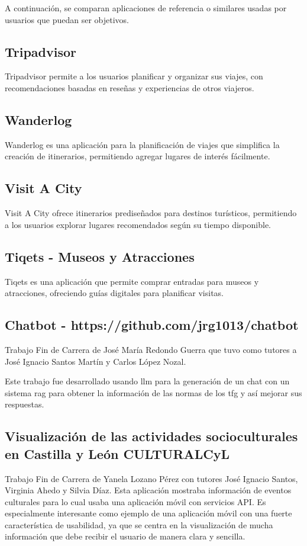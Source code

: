
A continuación, se comparan aplicaciones de referencia o similares usadas por usuarios que puedan ser objetivos.

\subsection{Tripadvisor}
Tripadvisor permite a los usuarios planificar y organizar sus viajes, con recomendaciones basadas en reseñas y experiencias de otros viajeros.

\subsection{Wanderlog}
Wanderlog es una aplicación para la planificación de viajes que simplifica la creación de itinerarios, permitiendo agregar lugares de interés fácilmente.

\subsection{Visit A City}
Visit A City ofrece itinerarios prediseñados para destinos turísticos, permitiendo a los usuarios explorar lugares recomendados según su tiempo disponible.

\subsection{Tiqets - Museos y Atracciones}
Tiqets es una aplicación que permite comprar entradas para museos y atracciones, ofreciendo guías digitales para planificar visitas.


\subsection{Chatbot - https://github.com/jrg1013/chatbot}
Trabajo Fin de Carrera de José María Redondo Guerra que tuvo como tutores a José Ignacio Santos Martín y Carlos López Nozal.

Este trabajo fue desarrollado usando \acrfull{llm} para la generación de un chat con un sistema \acrshort{rag} para obtener la información de las normas de los \acrshort{tfg} y así mejorar sus respuestas.

\subsection{Visualización de las actividades socioculturales en Castilla y León CULTURALCyL}
Trabajo Fin de Carrera de Yanela Lozano Pérez con tutores José Ignacio Santos, Virginia Ahedo y Silvia Díaz.
Esta aplicación mostraba información de eventos culturales para lo cual usaba una aplicación móvil con servicios API.
Es especialmente interesante como ejemplo de una aplicación móvil con una fuerte característica de usabilidad, ya que se centra en la visualización de mucha información que debe recibir el usuario de manera clara y sencilla.

